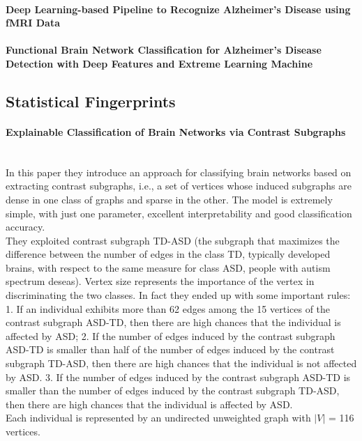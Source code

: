 \paragraph{Deep Learning-based Pipeline to Recognize Alzheimer’s Disease using fMRI Data}
\paragraph{Functional Brain Network Classification for Alzheimer’s Disease Detection with Deep Features and Extreme Learning Machine}

\subsection{Statistical Fingerprints}
\paragraph{Explainable Classification of Brain Networks via Contrast Subgraphs}\
\\

In this paper they introduce an approach for classifying brain networks based on extracting contrast subgraphs, i.e., a set of vertices whose induced subgraphs are dense in one class of graphs and sparse in the other. The model is extremely simple, with just one parameter, excellent interpretability and good classification accuracy. 
\\
They exploited contrast subgraph TD-ASD (the subgraph that maximizes the difference between the number of edges in the class TD, typically developed brains, with respect to the same measure for class ASD, people with autism spectrum deseas). Vertex size represents the importance of the vertex in discriminating the two classes. In fact they ended up with some important rules:
1. If an individual exhibits more than 62 edges among the 15 vertices of the contrast subgraph ASD-TD, then there are high chances that the individual is affected by ASD; 2. If the number of edges induced by the contrast subgraph ASD-TD is smaller than half of the number of edges induced by the contrast subgraph TD-ASD, then there are high chances that the individual is not affected by ASD. 3. If the number of edges induced by the contrast subgraph ASD-TD is smaller than the number of edges induced by the contrast subgraph TD-ASD, then there are high chances that the individual is affected by ASD.
\\
Each individual is represented by an undirected unweighted graph with $|V|$ = 116 vertices.
